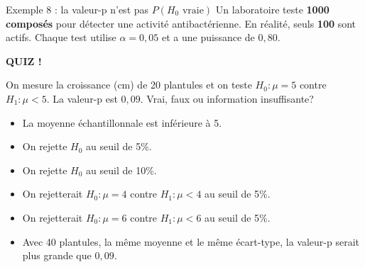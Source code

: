 \documentclass{BeamerTemplate}
\begin{document}
\begin{frame}[t]{Exemple 8 : la valeur-p n'est pas $P(H_0 \text{ vraie})$}
  Un laboratoire teste \textbf{1000 composés} pour détecter une activité antibactérienne. En réalité, seuls \textbf{100} sont actifs. Chaque test utilise $\alpha = 0{,}05$ et a une puissance de $0{,}80$.

  \medskip

  \raggedright
  \medskip
\end{frame}

\begin{frame}[plain,t]
  \centerline{\LARGE\bfseries\alert{QUIZ !}}

  \smallskip
  {\small On mesure la croissance (cm) de 20 plantules et on teste $H_0 : \mu = 5$ contre $H_1 : \mu < 5$. La valeur-p est $0{,}09$. Vrai, faux ou information insuffisante?}
  \begin{itemize}\itemsep 0.55cm
    \item La moyenne échantillonnale est inférieure à 5.
    \item<2-> On rejette $H_0$ au seuil de 5\%.
    \item<3-> On rejette $H_0$ au seuil de 10\%.
    \item<4-> On rejetterait $H_0 : \mu = 4$ contre $H_1 : \mu < 4$ au seuil de 5\%.
    \item<5-> On rejetterait $H_0 : \mu = 6$ contre $H_1 : \mu < 6$ au seuil de 5\%.
    \item<6-> Avec 40 plantules, la même moyenne et le même écart-type, la valeur-p serait plus grande que $0{,}09$.
  \end{itemize}
\end{frame}
\end{document}

